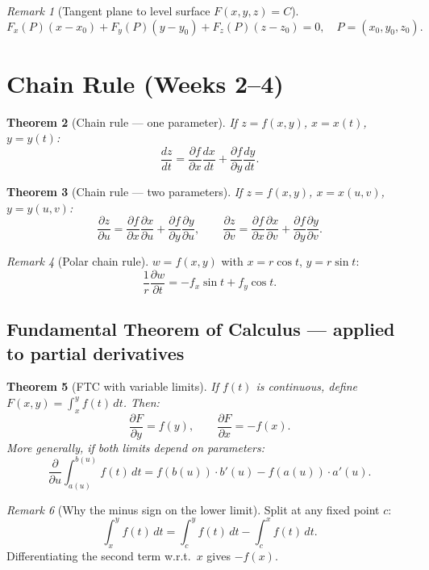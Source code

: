 \documentclass[12pt,a4paper]{article}
\newtheorem{theorem}{Theorem}[section]
\theoremstyle{definition}
\theoremstyle{remark}
\newtheorem{remark}[theorem]{Remark}
\newcommand{\pd}[2]{\dfrac{\partial #1}{\partial #2}}
\begin{document}
\begin{remark}[Tangent plane to level surface $F(x,y,z)=C$]
\[
  F_x(P)(x-x_0)+F_y(P)(y-y_0)+F_z(P)(z-z_0)=0, \quad P=(x_0,y_0,z_0).
\]
\end{remark}

\section{Chain Rule (Weeks 2--4)}

\begin{theorem}[Chain rule --- one parameter]
If $z=f(x,y)$, $x=x(t)$, $y=y(t)$:
\[
  \frac{dz}{dt} = \pd{f}{x}\frac{dx}{dt}+\pd{f}{y}\frac{dy}{dt}.
\]
\end{theorem}

\begin{theorem}[Chain rule --- two parameters]
If $z=f(x,y)$, $x=x(u,v)$, $y=y(u,v)$:
\[
  \pd{z}{u} = \pd{f}{x}\pd{x}{u}+\pd{f}{y}\pd{y}{u},
  \qquad
  \pd{z}{v} = \pd{f}{x}\pd{x}{v}+\pd{f}{y}\pd{y}{v}.
\]
\end{theorem}

\begin{remark}[Polar chain rule]
$w=f(x,y)$ with $x=r\cos t$, $y=r\sin t$:
\[
  \frac{1}{r}\pd{w}{t} = -f_x\sin t + f_y\cos t.
\]
\end{remark}

\subsection*{Fundamental Theorem of Calculus --- applied to partial derivatives}

\begin{theorem}[FTC with variable limits]
If $f(t)$ is continuous, define $F(x,y) = \displaystyle\int_x^y f(t)\,dt$. Then:
\[
  \pd{F}{y} = f(y), \qquad \pd{F}{x} = -f(x).
\]
More generally, if both limits depend on parameters:
\[
  \pd{}{u}\int_{a(u)}^{b(u)} f(t)\,dt = f(b(u))\cdot b'(u) - f(a(u))\cdot a'(u).
\]
\end{theorem}

\begin{remark}[Why the minus sign on the lower limit]
Split at any fixed point $c$:
\[
  \int_x^y f(t)\,dt = \int_c^y f(t)\,dt - \int_c^x f(t)\,dt.
\]
Differentiating the second term w.r.t.\ $x$ gives $-f(x)$.
\end{remark}
\end{document}
